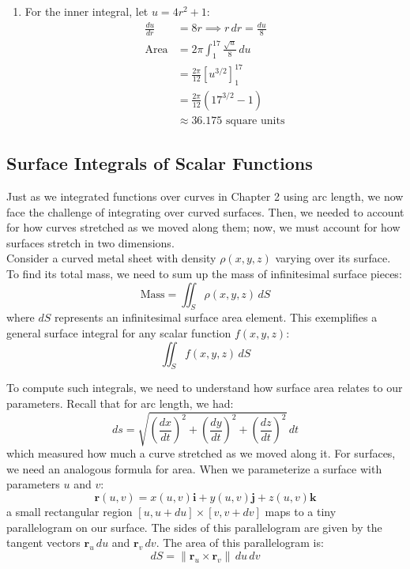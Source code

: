 \begin{example}
\begin{solution}
\begin{enumerate}
   \item For the inner integral, let $u = 4r^2 + 1$:
   \begin{align*}
       \frac{du}{dr} &= 8r \implies r\,dr = \frac{du}{8} \\
       \text{Area} &= 2\pi \int_1^{17} \frac{\sqrt{u}}{8}\,du \\
       &= \frac{2\pi}{12}[u^{3/2}]_1^{17} \\
       &= \frac{2\pi}{12}(17^{3/2} - 1) \\
       &\approx 36.175 \text{ square units}
   \end{align*}
\end{enumerate}
\end{solution}
\end{example}
\exampleline

\subsection*{Surface Integrals of Scalar Functions}

\noindent Just as we integrated functions over curves in Chapter 2 using arc length, we now face the challenge of integrating over curved surfaces. Then, we needed to account for how curves stretched as we moved along them; now, we must account for how surfaces stretch in two dimensions. \\

\noindent Consider a curved metal sheet with density $\rho(x,y,z)$ varying over its surface. To find its total mass, we need to sum up the mass of infinitesimal surface pieces:
\[
\text{Mass} = \iint_S \rho(x,y,z)\,dS
\]
where $dS$ represents an infinitesimal surface area element. This exemplifies a general surface integral for any scalar function $f(x,y,z)$:
\[
\iint_S f(x,y,z)\,dS
\]

\noindent To compute such integrals, we need to understand how surface area relates to our parameters. Recall that for arc length, we had:
\[
ds = \sqrt{\left(\frac{dx}{dt}\right)^2 + \left(\frac{dy}{dt}\right)^2 + \left(\frac{dz}{dt}\right)^2}\,dt
\]
which measured how much a curve stretched as we moved along it. For surfaces, we need an analogous formula for area. When we parameterize a surface with parameters $u$ and $v$:
\[
\mathbf{r}(u,v) = x(u,v)\mathbf{i} + y(u,v)\mathbf{j} + z(u,v)\mathbf{k}
\]
a small rectangular region $[u, u+du] \times [v, v+dv]$ maps to a tiny parallelogram on our surface. The sides of this parallelogram are given by the tangent vectors $\mathbf{r}_u\,du$ and $\mathbf{r}_v\,dv$. The area of this parallelogram is:
\[
dS = \|\mathbf{r}_u \times \mathbf{r}_v\|\,du\,dv
\]

